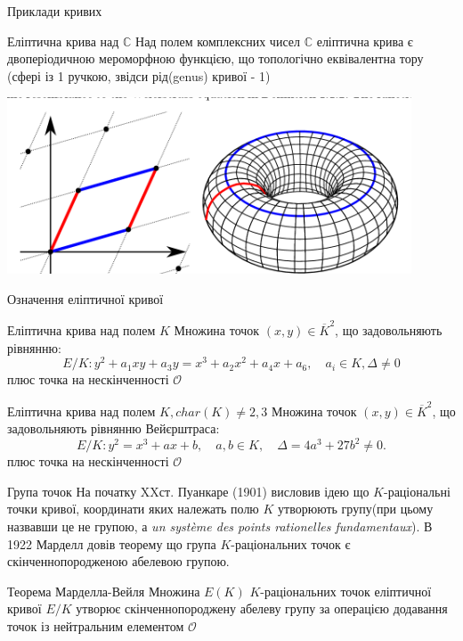 \documentclass[10pt]{beamer}
\begin{document}
\begin{darkframes}
\begin{frame}{Приклади кривих}
\end{frame}

\begin{frame}{Еліптична крива над $\mathbb{C}$}
    Над полем комплексних чисел $\mathbb{C}$ еліптична крива є двоперіодичною мероморфною функцією, що топологічно еквівалентна тору (сфері із 1 ручкою, звідси рід(genus) кривої - 1)
    \begin{center}
    \includegraphics[width=0.9\textwidth]{resources/torus.png}
    \end{center}
    
\end{frame}

\begin{frame}{Означення еліптичної кривої}
\begin{block}{Еліптична крива над полем $K$}
Множина точок $(x,y) \in \overline{K}^2$, що задовольняють рівнянню:
\[
  E/K: y^2 + a_1 xy + a_3 y = x^3 + a_2 x^2 + a_4 x + a_6, \quad a_i \in K, \Delta \neq 0
  \]
  плюс точка на нескінченності $\mathcal{O}$
\end{block}
\begin{block}{Еліптична крива над полем $K, char(K) \neq 2,3$}
  Множина точок $(x,y) \in \overline{K}^2$, що задовольняють рівнянню Вейєрштраса:
  \[
  E/K: y^2 = x^3 + ax + b,\quad a,b\in K,\quad \Delta = 4a^3+27b^2\neq 0.
  \]
  плюс точка на нескінченності $\mathcal{O}$
\end{block}
\end{frame}

\begin{frame}{Група точок}
На початку XXст. Пуанкаре (1901) висловив ідею що $K$-раціональні точки кривої, координати яких належать полю $K$ утворюють групу(при цьому назвавши це не групою, а \textit{un système des points rationelles fundamentaux}). В 1922 Марделл довів теорему що група $K$-раціональних точок є скінченнопородженою абелевою групою.
\begin{block}{Теорема Марделла-Вейля}
Множина $E(K)$ $K$-раціональних точок еліптичної кривої $E/K$ утворює скінченнопороджену абелеву групу за операцією додавання точок із нейтральним елементом $\mathcal{O}$
\end{block}
\end{frame}


\end{darkframes}
\end{document}
